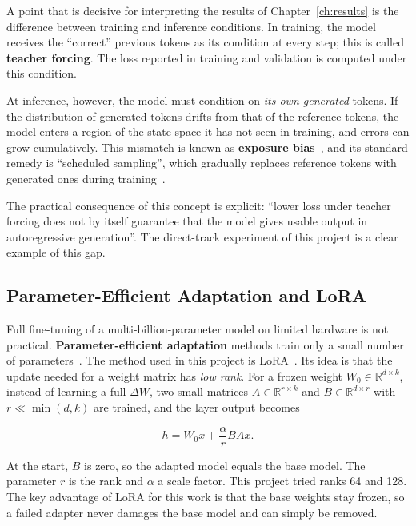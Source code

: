 A point that is decisive for interpreting the results of Chapter~\ref{ch:results}
is the difference between training and inference conditions. In training, the
model receives the ``correct'' previous tokens as its condition at every step; this
is called \textbf{teacher forcing}. The loss reported in training and validation is
computed under this condition.

At inference, however, the model must condition on \emph{its own generated}
tokens. If the distribution of generated tokens drifts from that of the reference
tokens, the model enters a region of the state space it has not seen in training,
and errors can grow cumulatively. This mismatch is known as \textbf{exposure
bias}~\cite{ranzato2016scheduledsampling}, and its standard remedy is ``scheduled
sampling'', which gradually replaces reference tokens with generated ones during
training~\cite{bengio2015scheduledsampling}.

The practical consequence of this concept is explicit: ``lower loss under teacher
forcing does not by itself guarantee that the model gives usable output in
autoregressive generation''. The direct-track experiment of this project is a clear
example of this gap.

\subsection{Parameter-Efficient Adaptation and LoRA}

Full fine-tuning of a multi-billion-parameter model on limited hardware is not
practical. \textbf{Parameter-efficient adaptation} methods train only a small
number of parameters~\cite{houlsby2019adapters,li2021prefixtuning}. The method used
in this project is LoRA~\cite{hu2022lora}. Its idea is that the update needed for a
weight matrix has \emph{low rank}. For a frozen weight
$W_0 \in \mathbb{R}^{d \times k}$, instead of learning a full $\Delta W$, two small
matrices $A \in \mathbb{R}^{r \times k}$ and $B \in \mathbb{R}^{d \times r}$ with
$r \ll \min(d,k)$ are trained, and the layer output becomes

\begin{equation}
h = W_0 x + \frac{\alpha}{r} B A x .
\label{eq:lora}
\end{equation}

At the start, $B$ is zero, so the adapted model equals the base model. The
parameter $r$ is the rank and $\alpha$ a scale factor. This project tried ranks 64
and 128. The key advantage of LoRA for this work is that the base weights stay
frozen, so a failed adapter never damages the base model and can simply be
removed.

